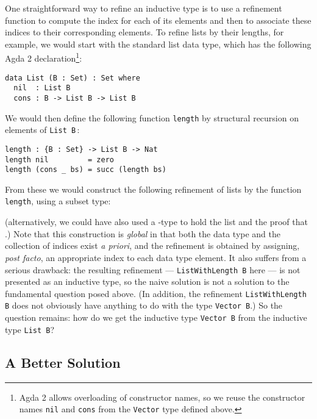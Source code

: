 \documentclass{LMCS}
\begin{document}
One straightforward way to refine an inductive type is to use a
refinement function to compute the index for each of its elements and
then to associate these indices to their corresponding elements. To
refine lists by their lengths, for example, we would start with the
standard list data type, which has the following Agda 2
declaration\footnote{Agda 2 allows overloading of constructor names,
  so we reuse the constructor names \texttt{nil} and \texttt{cons}
  from the \texttt{Vector} type defined above.}:
\begin{verbatim}
data List (B : Set) : Set where
  nil  : List B
  cons : B -> List B -> List B
\end{verbatim}
We would then define the following function \verb|length| by
structural recursion on elements of \texttt{List B}\,:
\begin{verbatim}
length : {B : Set} -> List B -> Nat
length nil         = zero
length (cons _ bs) = succ (length bs)
\end{verbatim}
From these we would construct the following refinement of lists by the
function \verb|length|, using a subset type: 

(alternatively, we could have also used a -type to hold the
list  and the proof that .)  Note that this construction is {\em global} in that
both the data type and the collection of indices exist {\em a priori},
and the refinement is obtained by assigning, {\em post facto}, an
appropriate index to each data type element. It also suffers from a
serious drawback: the resulting refinement --- \verb|ListWithLength B|
here --- is not presented as an inductive type, so the naive solution
is not a solution to the fundamental question posed above. (In
addition, the refinement \verb|ListWithLength B| does not obviously
have anything to do with the type \texttt{Vector B}.) So the question
remains: how do we get the inductive type \texttt{Vector B} from the
inductive type \texttt{List B}?

\subsection{A Better Solution}\label{sec:better-solution}
\end{document}
